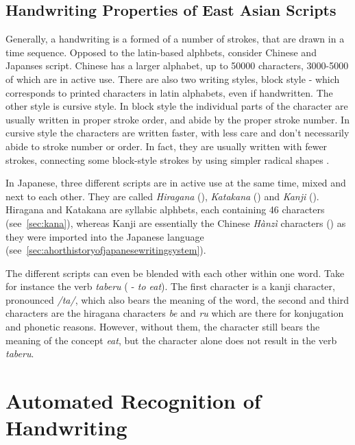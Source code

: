 \subsection{Handwriting Properties of East Asian Scripts}
\label{sec:handwritingpropertieseastasian}

Generally, a handwriting is a formed of a number of strokes, that are drawn
in a time sequence. Opposed to the latin-based alphbets, consider Chinese and
Japanses script. Chinese has a larger alphabet, up to 50000 characters, 
3000-5000 of which are in active use. There are also two writing styles,
block style - which corresponds to printed characters in latin alphabets,
even if handwritten. The other style is cursive style. In block style the
individual parts of the character are usually written in proper stroke order,
and abide by the proper stroke number. In cursive style the characters are
written faster, with less care and don't necessarily abide to stroke
number or order. In fact, they are usually written with fewer strokes,
connecting some block-style strokes by using simpler radical 
shapes .

In Japanese, three different scripts are in active use at the same time,
mixed and next to each other. They are called \emph{Hiragana} (), 
\emph{Katakana} () and \emph{Kanji} ().
Hiragana and Katakana are syllabic alphbets, each containing 46 characters
(see~\ref{sec:kana}), whereas Kanji are essentially the Chinese \emph{Hànzì} 
characters () as they were imported into the Japanese language 
(see~\ref{sec:ahorthistoryofjapanesewritingsystem}).

The different scripts can even be blended with each other within one word. 
Take for instance the verb \emph{taberu} ( - \emph{to eat}). 
The first character is a kanji character, 
pronounced \emph{/ta/}, which also bears the meaning of the word, 
the second and third characters are the hiragana characters 
\emph{be} and \emph{ru} which are there for konjugation and phonetic reasons. 
However, without them, the character  still bears the meaning of 
the concept \emph{eat}, but the character alone does not result in 
the verb \emph{taberu}.

\section{Automated Recognition of Handwriting}
\label{sec:autorecoofhandwriting}

